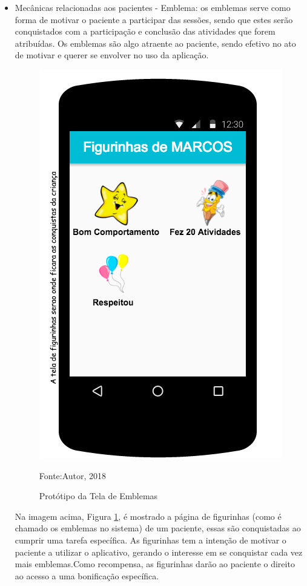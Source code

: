 	\begin{itemize}
	\item Mecânicas relacionadas aos pacientes
		 - Emblema: os emblemas serve como forma de motivar o paciente a participar das sessões, sendo que estes serão conquistados com a participação e conclusão das atividades que forem atribuídas. Os emblemas são algo atraente ao paciente, sendo efetivo no ato de motivar e querer se envolver no uso da aplicação.
		
		\begin{figure}[H]
			\centering
			\includegraphics[scale=0.6]{img/emblemaspaciente.png}
			\caption{Protótipo da Tela de Emblemas}
			Fonte:Autor, 2018
			\label{emblemas}
		\end{figure}
		
		Na imagem acima, Figura \ref{emblemas}, é mostrado a página de figurinhas (como é chamado os emblemas no sistema) de um paciente, essas são conquistadas ao cumprir uma tarefa específica. As figurinhas tem a intenção de motivar o paciente a utilizar o aplicativo, gerando o interesse em se conquistar cada vez mais emblemas.Como recompensa, as figurinhas darão ao paciente o direito ao acesso a uma bonificação específica.
		

\end{itemize}
